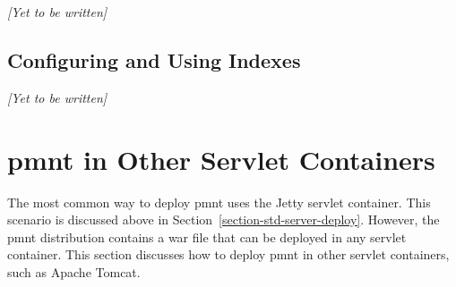 \emph{[Yet to be written]}

\subsection{Configuring and Using Indexes}
\label{section-indexes}

\emph{[Yet to be written]}



\section{\ac{pmnt} in Other Servlet Containers}
\label{section-parliament-with-jena-and-tomcat}

The most common way to deploy \ac{pmnt} uses the Jetty servlet container.  This scenario is discussed above in Section~\ref{section-std-server-deploy}.  However, the \ac{pmnt} distribution contains a war file that can be deployed in any servlet container.  This section discusses how to deploy \ac{pmnt} in other servlet containers, such as Apache Tomcat.

